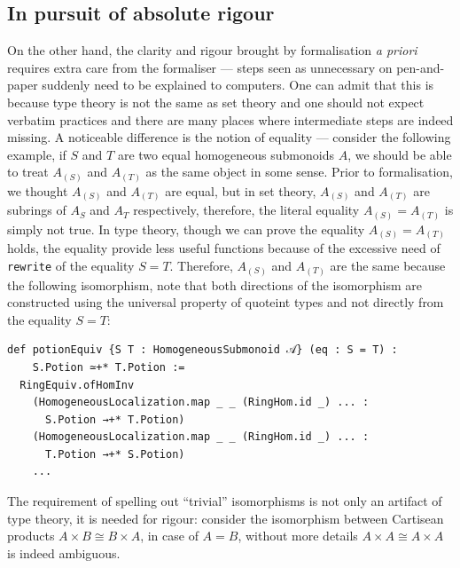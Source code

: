 \documentclass[graybox]{svmult}
\begin{document}
\subsection*{In pursuit of absolute rigour}%
On the other hand, the clarity and rigour brought by formalisation \textit{a priori} requires extra 
care from the formaliser --- steps seen as unnecessary on pen-and-paper suddenly need to 
be explained to computers. One can admit that this is because type theory is not the same as set theory and 
one should not expect verbatim practices and there are many places where intermediate steps are indeed missing.
A noticeable difference is the notion of equality --- consider the following example, if $S$ and $T$ are two equal homogeneous submonoids $A$, 
we should be able to treat $A_{(S)}$ and $A_{(T)}$ as the same object in some sense. 
Prior to formalisation, we thought $A_{(S)}$ and $A_{(T)}$ are equal, but in set theory, $A_{(S)}$ and $A_{(T)}$ are subrings of $A_S$ and $A_T$ respectively,  
therefore, the literal equality $A_{(S)} = A_{(T)}$ is simply not true. 
In type theory, though we can prove the equality $A_{(S)} = A_{(T)}$ holds, the equality provide less useful functions because of the excessive need of \lstinline|rewrite| of the equality $S = T$.
Therefore, $A_{(S)}$ and $A_{(T)}$ are the same because the following isomorphism, note that both directions of the isomorphism are constructed
using the universal property of quoteint types and not directly from the equality $S = T$:
\begin{lstlisting}
def potionEquiv {S T : HomogeneousSubmonoid 𝒜} (eq : S = T) : 
    S.Potion ≃+* T.Potion := 
  RingEquiv.ofHomInv
    (HomogeneousLocalization.map _ _ (RingHom.id _) ... : 
      S.Potion →+* T.Potion)
    (HomogeneousLocalization.map _ _ (RingHom.id _) ... : 
      T.Potion →+* S.Potion)
    ...
\end{lstlisting}
The requirement of spelling out ``trivial'' isomorphisms is not only an artifact of type theory, 
it is needed for rigour: consider the isomorphism between Cartisean products $A \times B \cong B \times A$, in case of $A = B$,
without more details $A \times A \cong A \times A$ is indeed ambiguous. 
\end{document}
